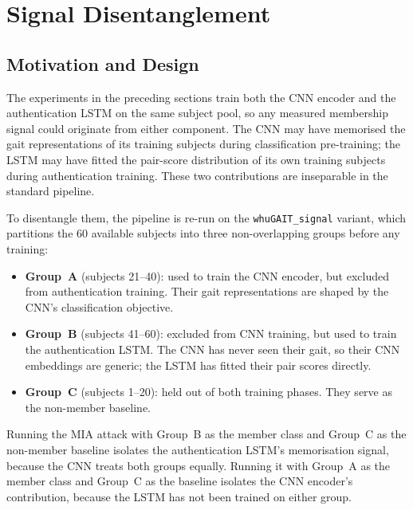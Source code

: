 \section{Signal Disentanglement}
\label{sec:mia_signal}

\subsection{Motivation and Design}
\label{ssec:mia_signal_design}

The experiments in the preceding sections train both the CNN encoder and the authentication LSTM on the same subject pool, so any measured membership signal could originate from either component. The CNN may have memorised the gait representations of its training subjects during classification pre-training; the LSTM may have fitted the pair-score distribution of its own training subjects during authentication training. These two contributions are inseparable in the standard pipeline.

To disentangle them, the pipeline is re-run on the \texttt{whuGAIT\_signal} variant, which partitions the 60 available subjects into three non-overlapping groups before any training:

\begin{itemize}
  \item \textbf{Group~A} (subjects 21–40): used to train the CNN encoder, but
    excluded from authentication training. Their gait representations are
    shaped by the CNN's classification objective.
  \item \textbf{Group~B} (subjects 41–60): excluded from CNN training, but
    used to train the authentication LSTM. The CNN has never seen their gait,
    so their CNN embeddings are generic; the LSTM has fitted their pair scores
    directly.
  \item \textbf{Group~C} (subjects 1–20): held out of both training phases.
    They serve as the non-member baseline.
\end{itemize}

Running the MIA attack with Group~B as the member class and Group~C as the non-member baseline isolates the authentication LSTM's memorisation signal, because the CNN treats both groups equally. Running it with Group~A as the member class and Group~C as the baseline isolates the CNN encoder's contribution, because the LSTM has not been trained on either group.

